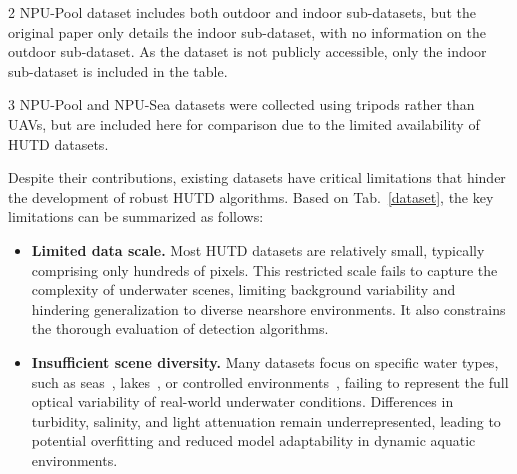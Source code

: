 \begin{table*}[!t]
\begin{threeparttable}
\begin{tablenotes}
        \item[2] NPU-Pool dataset includes both outdoor and indoor sub-datasets, but the original paper only details the indoor sub-dataset, with no information on the \\ outdoor sub-dataset. As the dataset is not publicly accessible, only the indoor sub-dataset is included in the table.
        \item[3] NPU-Pool and NPU-Sea datasets were collected using tripods rather than UAVs, but are included here for comparison due to the limited availability of \\ HUTD datasets.
    \end{tablenotes}
    \end{threeparttable}
\end{table*}
\par  
Despite their contributions, existing datasets have critical limitations that hinder the development of robust HUTD algorithms.  
Based on Tab.~\ref{dataset}, the key limitations can be summarized as follows:  
\begin{itemize}  
    \item \textbf{Limited data scale.}  
    Most HUTD datasets are relatively small, typically comprising only hundreds of pixels.  
    This restricted scale fails to capture the complexity of underwater scenes, limiting background variability and hindering generalization to diverse nearshore environments.  
    It also constrains the thorough evaluation of detection algorithms.  
    \item \textbf{Insufficient scene diversity.}  
    Many datasets focus on specific water types, such as seas~\cite{Zhang2023}, lakes~\cite{Liu2024}, or controlled environments~\cite{LiZheyong2023}, failing to represent the full optical variability of real-world underwater conditions.  
    Differences in turbidity, salinity, and light attenuation remain underrepresented, leading to potential overfitting and reduced model adaptability in dynamic aquatic environments.  
\end{itemize}  
\par

